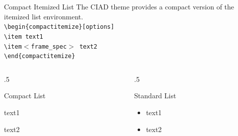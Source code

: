 \documentclass[english,sectioncirclenumberstyle]{ciadbeamer}
\begin{document}
\begin{frame}{Compact Itemized List}
	The CIAD theme provides a compact version of the itemized list environment. \\[.5cm]
	{\smaller
	\texttt{{\textbackslash}begin\{compactitemize\}[options]} \\
	\texttt{{\textbackslash}item text1} \\
	\texttt{{\textbackslash}item$<$frame\_spec$>$ text2} \\
	\texttt{{\textbackslash}end\{compactitemize\}}} \\[.5cm]
	\begin{columns}
		\begin{column}{.5\linewidth}
			\begin{block}{Compact List}
				\begin{compactitemize}
				\item text1
				\item<2> text2
				\end{compactitemize}
			\end{block}
		\end{column}
		\begin{column}{.5\linewidth}
			\begin{block}{Standard List}
				\begin{itemize}
				\item text1
				\item<2> text2
				\end{itemize}
			\end{block}
		\end{column}
	\end{columns}
\end{frame}
\end{document}
